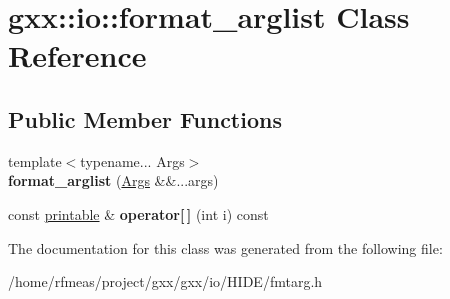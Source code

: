 \hypertarget{classgxx_1_1io_1_1format__arglist}{}\section{gxx\+:\+:io\+:\+:format\+\_\+arglist Class Reference}
\label{classgxx_1_1io_1_1format__arglist}
\subsection*{Public Member Functions}
\begin{DoxyCompactItemize}
\item 
{\footnotesize template$<$typename... Args$>$ }\\{\bfseries format\+\_\+arglist} (\hyperlink{structArgs}{Args} \&\&...args)\hypertarget{classgxx_1_1io_1_1format__arglist_a8e1b0624d50e598983607ac67c20ad3a}{}\label{classgxx_1_1io_1_1format__arglist_a8e1b0624d50e598983607ac67c20ad3a}

\item 
const \hyperlink{classgxx_1_1io_1_1printable}{printable} \& {\bfseries operator\mbox{[}$\,$\mbox{]}} (int i) const \hypertarget{classgxx_1_1io_1_1format__arglist_a06e88a088a49fce60223f44288760a59}{}\label{classgxx_1_1io_1_1format__arglist_a06e88a088a49fce60223f44288760a59}

\end{DoxyCompactItemize}


The documentation for this class was generated from the following file\+:\begin{DoxyCompactItemize}
\item 
/home/rfmeas/project/gxx/gxx/io/\+H\+I\+D\+E/fmtarg.\+h\end{DoxyCompactItemize}
